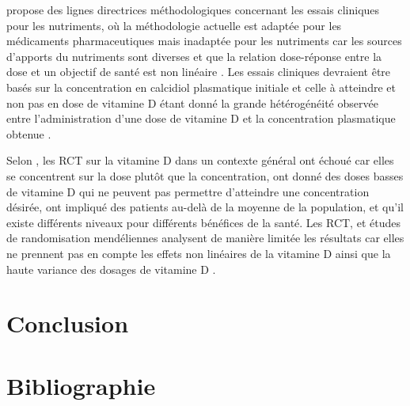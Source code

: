 \documentclass[
  a4paper,
  DIV=11,
  numbers=noendperiod,
  listof=totoc]{scrreprt}
\begin{document}
\textcite{Heaney.2014} propose des lignes directrices méthodologiques
concernant les essais cliniques pour les nutriments, où la méthodologie
actuelle est adaptée pour les médicaments pharmaceutiques mais inadaptée
pour les nutriments car les sources d'apports du nutriments sont
diverses et que la relation dose-réponse entre la dose et un objectif de
santé est non linéaire \autocite{Grant.2022.nutrients}. Les essais
cliniques devraient être basés sur la concentration en calcidiol
plasmatique initiale et celle à atteindre et non pas en dose de vitamine
D étant donné la grande hétérogénéité observée entre l'administration
d'une dose de vitamine D et la concentration plasmatique obtenue
\autocite{Grant.2022.nutrients}.

Selon \textcite{Grant.2022.nutrients}, les RCT sur la vitamine D dans un
contexte général ont échoué car elles se concentrent sur la dose plutôt
que la concentration, ont donné des doses basses de vitamine D qui ne
peuvent pas permettre d'atteindre une concentration désirée, ont
impliqué des patients au-delà de la moyenne de la population, et qu'il
existe différents niveaux pour différents bénéfices de la santé. Les
RCT, et études de randomisation mendéliennes analysent de manière
limitée les résultats car elles ne prennent pas en compte les effets non
linéaires de la vitamine D ainsi que la haute variance des dosages de
vitamine D \autocite{Grant.2022}.

\newpage{}

\chapter{Conclusion}\label{conclusion}

\newpage{}

\hypertarget{Bibliographie}{%
\chapter*{\centering Bibliographie}\label{Bibliographie}}
\singlespace

\printbibliography[heading=none]
\end{document}
